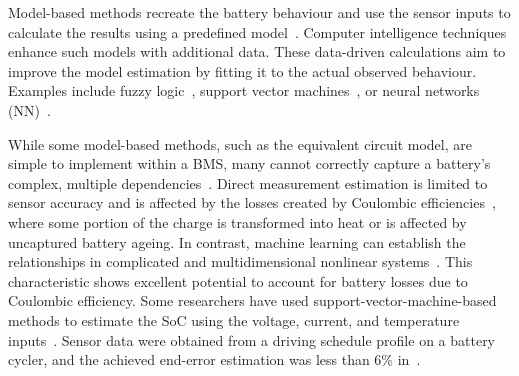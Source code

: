 Model-based methods recreate the battery behaviour and use the sensor inputs to calculate the results using a predefined model~\cite{6953745}.
Computer intelligence techniques enhance such models with additional data.
These data-driven calculations aim to improve the model estimation by fitting it to the actual observed behaviour.
Examples include fuzzy logic~\cite{malkhandi_fuzzy_2006}, support vector machines~\cite{hansen_support_2005, anton_battery_2013}, or neural networks (NN)~\cite{song_lithium-ion_2018,Chemali2017,mamo_long_2020,jiao_gru-rnn_2020,xiao_accurate_2019,javid_adaptive_2020,zhang_deep_2020}.

%
While some model-based methods, such as the equivalent circuit model, are simple to implement within a BMS, many cannot correctly capture a battery's complex, multiple dependencies~\cite{6953745}.
Direct measurement estimation is limited to sensor accuracy and is affected by the losses created by Coulombic efficiencies~\cite{Smith_2010}, where some portion of the charge is transformed into heat or is affected by uncaptured battery ageing.
%
In contrast, machine learning can establish the relationships in complicated and multidimensional nonlinear systems~\cite{hansen_support_2005,anton_battery_2013,he_state_2014}.
This characteristic shows excellent potential to account for battery losses due to Coulombic efficiency.
Some researchers have used support-vector-machine-based methods to estimate the SoC using the voltage, current, and temperature inputs~\cite{hansen_support_2005,anton_battery_2013}.
Sensor data were obtained from a driving schedule profile on a battery cycler, and the achieved end-error estimation was less than 6\% in~\cite{he_state_2014}.
